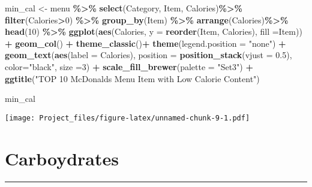 \documentclass[
]{article}
\newenvironment{Shaded}{\begin{snugshade}}{\end{snugshade}}
\newcommand{\AttributeTok}[1]{\textcolor[rgb]{0.13,0.29,0.53}{#1}}
\newcommand{\DecValTok}[1]{\textcolor[rgb]{0.00,0.00,0.81}{#1}}
\newcommand{\FloatTok}[1]{\textcolor[rgb]{0.00,0.00,0.81}{#1}}
\newcommand{\FunctionTok}[1]{\textcolor[rgb]{0.13,0.29,0.53}{\textbf{#1}}}
\newcommand{\NormalTok}[1]{#1}
\newcommand{\OtherTok}[1]{\textcolor[rgb]{0.56,0.35,0.01}{#1}}
\newcommand{\SpecialCharTok}[1]{\textcolor[rgb]{0.81,0.36,0.00}{\textbf{#1}}}
\newcommand{\StringTok}[1]{\textcolor[rgb]{0.31,0.60,0.02}{#1}}
\begin{document}
\begin{Shaded}
\begin{Highlighting}[]
\NormalTok{min\_cal }\OtherTok{\textless{}{-}}\NormalTok{ menu }\SpecialCharTok{\%\textgreater{}\%}
  \FunctionTok{select}\NormalTok{(Category,}
\NormalTok{         Item,}
\NormalTok{         Calories)}\SpecialCharTok{\%\textgreater{}\%} 
  \FunctionTok{filter}\NormalTok{(Calories}\SpecialCharTok{\textgreater{}}\DecValTok{0}\NormalTok{) }\SpecialCharTok{\%\textgreater{}\%} 
  \FunctionTok{group\_by}\NormalTok{(Item) }\SpecialCharTok{\%\textgreater{}\%} 
  \FunctionTok{arrange}\NormalTok{(Calories)}\SpecialCharTok{\%\textgreater{}\%} 
  \FunctionTok{head}\NormalTok{(}\DecValTok{10}\NormalTok{) }\SpecialCharTok{\%\textgreater{}\%} 
  \FunctionTok{ggplot}\NormalTok{(}\FunctionTok{aes}\NormalTok{(Calories,}
             \AttributeTok{y =} \FunctionTok{reorder}\NormalTok{(Item,}
\NormalTok{                         Calories),}
             \AttributeTok{fill =}\NormalTok{Item)) }\SpecialCharTok{+} 
  \FunctionTok{geom\_col}\NormalTok{() }\SpecialCharTok{+} 
  \FunctionTok{theme\_classic}\NormalTok{()}\SpecialCharTok{+} 
  \FunctionTok{theme}\NormalTok{(}\AttributeTok{legend.position =} \StringTok{"none"}\NormalTok{) }\SpecialCharTok{+} 
  \FunctionTok{geom\_text}\NormalTok{(}\FunctionTok{aes}\NormalTok{(}\AttributeTok{label =}\NormalTok{ Calories), }
            \AttributeTok{position =} \FunctionTok{position\_stack}\NormalTok{(}\AttributeTok{vjust =} \FloatTok{0.5}\NormalTok{),}
            \AttributeTok{color=}\StringTok{"black"}\NormalTok{, }\AttributeTok{size =}\DecValTok{3}\NormalTok{) }\SpecialCharTok{+}
  \FunctionTok{scale\_fill\_brewer}\NormalTok{(}\AttributeTok{palette =} \StringTok{"Set3"}\NormalTok{) }\SpecialCharTok{+} \FunctionTok{ggtitle}\NormalTok{(}\StringTok{"TOP 10 McDonald\textquotesingle{}s Menu Item with Low Calorie Content"}\NormalTok{)}

\NormalTok{min\_cal}
\end{Highlighting}
\end{Shaded}

\texttt{[image: Project\_files/figure-latex/unnamed-chunk-9-1.pdf]}

\hypertarget{carboydrates}{%
\section{Carboydrates}\label{carboydrates}}

\begin{center}\rule{0.5\linewidth}{0.5pt}\end{center}
\end{document}
